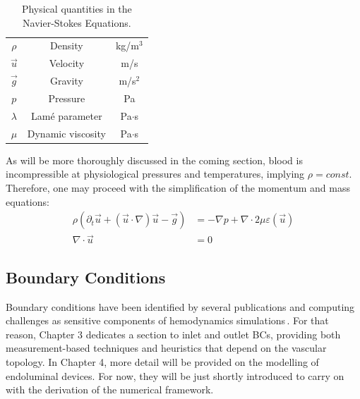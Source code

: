 \begin{table}[ht]
	\centering
	\begin{tabular}{c|c|c}
		$\rho$    & Density           & kg/m$^3$   \\
		$\vec{u}$ & Velocity          & m/s        \\
		$\vec{g}$ & Gravity           & m/s$^2$    \\
		$p$       & Pressure          & Pa         \\
		$\lambda$ & Lamé parameter    & Pa$\cdot$s \\
		$\mu$     & Dynamic viscosity & Pa$\cdot$s \\
	\end{tabular}
	\caption{Physical quantities in the Navier-Stokes Equations.}
\end{table}
As will be more thoroughly discussed in the coming section, blood is incompressible at physiological pressures and temperatures, implying $\rho=const$. Therefore, one may proceed with the simplification of the momentum and mass equations:
\begin{equation}
	\begin{split}
		\rho\left(\partial_t\vec{u} + (\vec{u}\cdot\nabla)\vec{u} - \vec{g}\right) &= -\nabla p + \nabla \cdot 2\mu \varepsilon(\vec{u})\\
		\nabla\cdot \vec{u} &= 0
	\end{split}
	\label{eqn:navier_stokes}
\end{equation}

\subsection{Boundary Conditions}
Boundary conditions have been identified by several publications and computing challenges as sensitive components of hemodynamics simulations\,\cite{Berg2019, Valen-Sendstad2018}. For that reason, Chapter 3 dedicates a section to inlet and outlet BCs, providing both measurement-based techniques and heuristics that depend on the vascular topology. In Chapter 4, more detail will be provided on the modelling of endoluminal devices. For now, they will be just shortly introduced to carry on with the derivation of the numerical framework.\\


